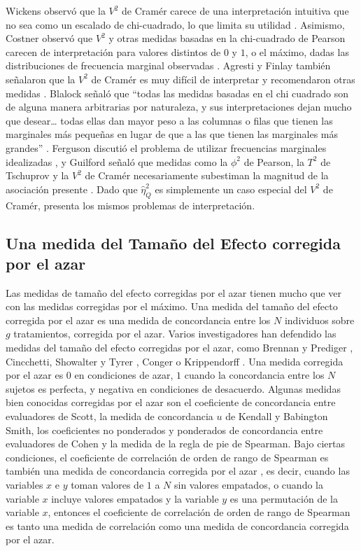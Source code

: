 \documentclass[12pt,a4paper,]{book}
\numberwithin{dummy}{section}
\theoremstyle{ocrenumbox}
\theoremstyle{blacknumex}
\theoremstyle{blacknumbox}
\theoremstyle{ocrenum}
\theoremstyle{ocrenum}
\begin{document}
Wickens observó que la \(V^2\) de Cramér carece de una interpretación
intuitiva que no sea como un escalado de chi-cuadrado, lo que limita su
utilidad \citep{Wickens1989}. Asimismo, Costner observó que \(V^2\) y
otras medidas basadas en la chi-cuadrado de Pearson carecen de
interpretación para valores distintos de \(0\) y \(1\), o el máximo,
dadas las distribuciones de frecuencia marginal observadas
\citep{Costner1965}. Agresti y Finlay también señalaron que la \(V^2\)
de Cramér es muy difícil de interpretar y recomendaron otras medidas
\citep{Agresti1997}. Blalock señaló que ``todas las medidas basadas en
el chi cuadrado son de alguna manera arbitrarias por naturaleza, y sus
interpretaciones dejan mucho que desear\ldots{} todas ellas dan mayor
peso a las columnas o filas que tienen las marginales más pequeñas en
lugar de que a las que tienen las marginales más grandes''
\citep{Blalock1958}. Ferguson discutió el problema de utilizar
frecuencias marginales idealizadas \citep{Ferguson1981}, y Guilford
señaló que medidas como la \(\phi^2\) de Pearson, la \(T^2\) de
Tschuprov y la \(V^2\) de Cramér necesariamente subestiman la magnitud
de la asociación presente \citep{Guilford1950}. Dado que
\(\hat\eta_Q^2\) es simplemente un caso especial del \(V^2\) de Cramér,
presenta los mismos problemas de interpretación.

\hypertarget{una-medida-del-tamauxf1o-del-efecto-corregida-por-el-azar}{%
\subsection{Una medida del Tamaño del Efecto corregida por el
azar}\label{una-medida-del-tamauxf1o-del-efecto-corregida-por-el-azar}}

Las medidas de tamaño del efecto corregidas por el azar tienen mucho que
ver con las medidas corregidas por el máximo. Una medida del tamaño del
efecto corregida por el azar es una medida de concordancia entre los
\(N\) individuos sobre \(g\) tratamientos, corregida por el azar. Varios
investigadores han defendido las medidas del tamaño del efecto
corregidas por el azar, como Brennan y Prediger \citep{Brennan1981},
Cincchetti, Showalter y Tyrer \citep{Cicchetti1985}, Conger
\citep{Conger1985} o Krippendorff \citep{Krippendorff1970}. Una medida
corregida por el azar es \(0\) en condiciones de azar, \(1\) cuando la
concordancia entre los \(N\) sujetos es perfecta, y negativa en
condiciones de desacuerdo. Algunas medidas bien conocidas corregidas por
el azar son el coeficiente de concordancia entre evaluadores de Scott,
la medida de concordancia \(u\) de Kendall y Babington Smith, los
coeficientes no ponderados y ponderados de concordancia entre
evaluadores de Cohen y la medida de la regla de pie de Spearman. Bajo
ciertas condiciones, el coeficiente de correlación de orden de rango de
Spearman es también una medida de concordancia corregida por el azar
\citep{Spearman1904}, es decir, cuando las variables \(x\) e \(y\) toman
valores de \(1\) a \(N\) sin valores empatados, o cuando la variable
\(x\) incluye valores empatados y la variable \(y\) es una permutación
de la variable \(x\), entonces el coeficiente de correlación de orden de
rango de Spearman es tanto una medida de correlación como una medida de
concordancia corregida por el azar.
\end{document}
